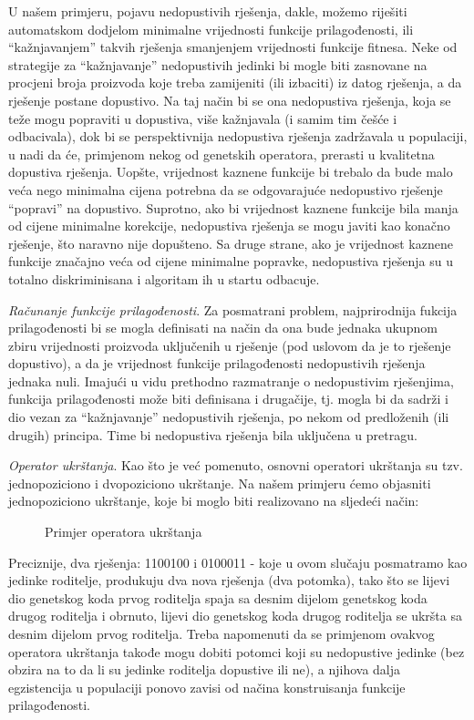 \documentclass[a4paper, utf8, 11pt, colorlinks]{book}
\begin{document}
U našem primjeru, pojavu nedopustivih rješenja, dakle, možemo riješiti automatskom dodjelom minimalne vrijednosti funkcije prilagođenosti, ili ``kažnjavanjem'' takvih rješenja smanjenjem vrijednosti funkcije fitnesa. Neke od strategije za ``kažnjavanje'' nedopustivih jedinki bi mogle biti zasnovane na procjeni broja proizvoda koje treba zamijeniti (ili izbaciti) iz datog rješenja, a da rješenje postane dopustivo. Na taj način bi se ona nedopustiva rješenja, koja se teže mogu popraviti u dopustiva, više kažnjavala (i samim tim češće i odbacivala), dok bi se perspektivnija nedopustiva rješenja zadržavala u populaciji, u nadi da će, primjenom nekog od genetskih operatora, prerasti u kvalitetna dopustiva rješenja. Uopšte, vrijednost kaznene funkcije bi trebalo da bude malo veća nego minimalna cijena potrebna da se odgovarajuće nedopustivo rješenje ``popravi'' na dopustivo. Suprotno, ako bi vrijednost kaznene funkcije bila manja od cijene minimalne korekcije, nedopustiva rješenja se mogu javiti kao konačno rješenje, što naravno nije dopušteno. Sa druge strane, ako je vrijednost kaznene funkcije značajno veća od cijene minimalne popravke, nedopustiva rješenja su u totalno diskriminisana i algoritam ih u startu odbacuje. 

\emph{Računanje funkcije prilagođenosti}. Za posmatrani problem, najprirodnija fukcija prilagođenosti bi se mogla definisati na način da ona bude jednaka ukupnom zbiru vrijednosti proizvoda uključenih u rješenje (pod uslovom da je to rješenje dopustivo), a da je vrijednost funkcije prilagođenosti  nedopustivih rješenja   jednaka nuli. 
Imajući u vidu prethodno razmatranje o nedopustivim rješenjima, funkcija prilagođenosti može biti definisana i drugačije, tj. mogla bi da sadrži i dio vezan za  ``kažnjavanje'' nedopustivih rješenja, po nekom od predloženih (ili drugih) principa. Time bi nedopustiva rješenja bila uključena u pretragu.

\emph{Operator ukrštanja}. Kao što je već pomenuto, osnovni operatori ukrštanja su tzv. jednopoziciono i dvopoziciono ukrštanje. Na našem primjeru ćemo objasniti  jednopoziciono ukrštanje, koje bi moglo biti realizovano na sljedeći način:
\begin{figure}
	\caption{Primjer operatora ukrštanja}
\end{figure}

Preciznije, dva rješenja: 1100100 i 0100011 - koje u ovom slučaju posmatramo kao jedinke roditelje, produkuju dva nova rješenja (dva potomka), tako što se lijevi dio genetskog koda prvog roditelja spaja sa desnim dijelom genetskog koda drugog roditelja i obrnuto, lijevi dio genetskog koda drugog roditelja se ukršta sa desnim dijelom prvog roditelja. 
Treba napomenuti da se primjenom ovakvog operatora ukrštanja takođe mogu dobiti potomci koji su nedopustive jedinke (bez obzira na to da li su jedinke roditelja dopustive ili ne), a njihova dalja egzistencija u populaciji ponovo zavisi od načina konstruisanja funkcije prilagođenosti.
\end{document}
